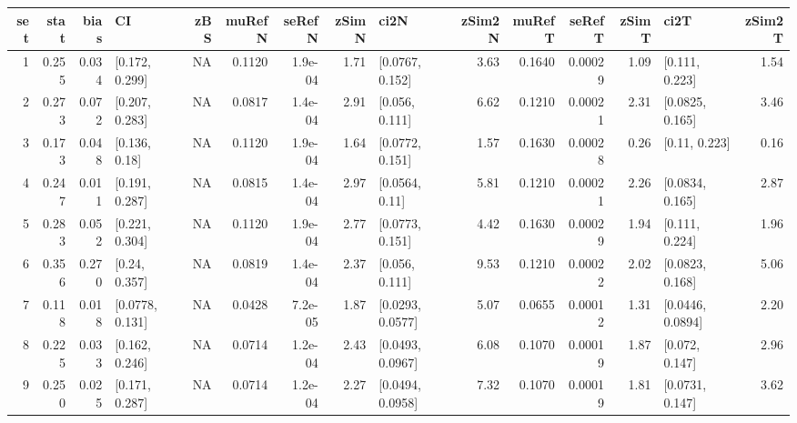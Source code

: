 
\begin{tabular}{r|r|r|l|r|r|r|r|l|r|r|r|r|l|r}
\hline
set & stat & bias & CI & zBS & muRefN & seRefN & zSimN & ci2N & zSim2N & muRefT & seRefT & zSimT & ci2T & zSim2T\\
\hline
1 & 0.255 & 0.034 & [0.172, 0.299] & NA & 0.1120 & 1.9e-04 & 1.71 & [0.0767, 0.152] & 3.63 & 0.1640 & 0.00029 & 1.09 & [0.111, 0.223] & 1.54\\
\hline
2 & 0.273 & 0.072 & [0.207, 0.283] & NA & 0.0817 & 1.4e-04 & 2.91 & [0.056, 0.111] & 6.62 & 0.1210 & 0.00021 & 2.31 & [0.0825, 0.165] & 3.46\\
\hline
3 & 0.173 & 0.048 & [0.136, 0.18] & NA & 0.1120 & 1.9e-04 & 1.64 & [0.0772, 0.151] & 1.57 & 0.1630 & 0.00028 & 0.26 & [0.11, 0.223] & 0.16\\
\hline
4 & 0.247 & 0.011 & [0.191, 0.287] & NA & 0.0815 & 1.4e-04 & 2.97 & [0.0564, 0.11] & 5.81 & 0.1210 & 0.00021 & 2.26 & [0.0834, 0.165] & 2.87\\
\hline
5 & 0.283 & 0.052 & [0.221, 0.304] & NA & 0.1120 & 1.9e-04 & 2.77 & [0.0773, 0.151] & 4.42 & 0.1630 & 0.00029 & 1.94 & [0.111, 0.224] & 1.96\\
\hline
6 & 0.356 & 0.270 & [0.24, 0.357] & NA & 0.0819 & 1.4e-04 & 2.37 & [0.056, 0.111] & 9.53 & 0.1210 & 0.00022 & 2.02 & [0.0823, 0.168] & 5.06\\
\hline
7 & 0.118 & 0.018 & [0.0778, 0.131] & NA & 0.0428 & 7.2e-05 & 1.87 & [0.0293, 0.0577] & 5.07 & 0.0655 & 0.00012 & 1.31 & [0.0446, 0.0894] & 2.20\\
\hline
8 & 0.225 & 0.033 & [0.162, 0.246] & NA & 0.0714 & 1.2e-04 & 2.43 & [0.0493, 0.0967] & 6.08 & 0.1070 & 0.00019 & 1.87 & [0.072, 0.147] & 2.96\\
\hline
9 & 0.250 & 0.025 & [0.171, 0.287] & NA & 0.0714 & 1.2e-04 & 2.27 & [0.0494, 0.0958] & 7.32 & 0.1070 & 0.00019 & 1.81 & [0.0731, 0.147] & 3.62\\
\hline
\end{tabular}
